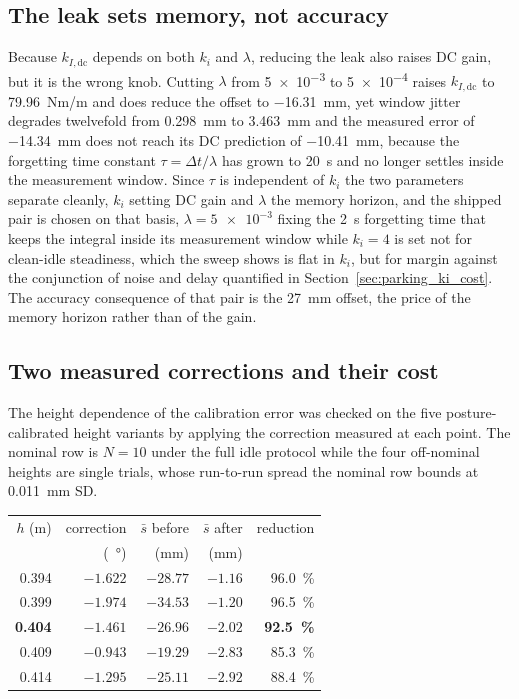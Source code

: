 \documentclass[a4paper,fleqn]{cas-dc}
\begin{document}
\subsection{The leak sets memory, not accuracy}

Because $k_{I,\text{dc}}$ depends on both $k_i$ and $\lambda$, reducing the leak
also raises DC gain, but it is the wrong knob. Cutting $\lambda$ from \num{5e-3}
to \num{5e-4} raises $k_{I,\text{dc}}$ to \SI{79.96}{Nm/m} and does reduce the
offset to \SI{-16.31}{mm}, yet window jitter degrades twelvefold from
\SI{0.298}{mm} to \SI{3.463}{mm} and the measured error of \SI{-14.34}{mm} does
not reach its DC prediction of \SI{-10.41}{mm}, because the forgetting time
constant $\tau{=}\Delta t/\lambda$ has grown to \SI{20}{s} and no longer settles
inside the measurement window. Since $\tau$ is independent of $k_i$ the two
parameters separate cleanly, $k_i$ setting DC gain and $\lambda$ the memory
horizon, and the shipped pair is chosen on that basis, $\lambda{=}\num{5e-3}$
fixing the \SI{2}{s} forgetting time that keeps the integral inside its
measurement window while $k_i{=}\num{4}$ is set not for clean-idle steadiness,
which the sweep shows is flat in $k_i$, but for margin against the conjunction of
noise and delay quantified in Section~\ref{sec:parking_ki_cost}. The accuracy
consequence of that pair is the \SI{27}{mm} offset, the price of the memory
horizon rather than of the gain.

\subsection{Two measured corrections and their cost}

The height dependence of the calibration error was checked on the five
posture-calibrated height variants by applying the correction measured at each
point. The nominal row is $N{=}10$ under the full idle protocol while the four
off-nominal heights are single trials, whose run-to-run spread the nominal row
bounds at \SI{0.011}{mm} SD.

\begin{center}\footnotesize
\begin{tabular}{rrrrr}
\hline
$h$ (m) & correction & $\bar{s}$ before & $\bar{s}$ after & reduction \\
 & (\SI{}{\degree}) & (mm) & (mm) & \\
\hline
0.394 & $-1.622$ & $-28.77$ & $-1.16$ & \SI{96.0}{\percent} \\
0.399 & $-1.974$ & $-34.53$ & $-1.20$ & \SI{96.5}{\percent} \\
\textbf{0.404} & $\mathbf{-1.461}$ & $\mathbf{-26.96}$ & $\mathbf{-2.02}$ & \textbf{\SI{92.5}{\percent}} \\
0.409 & $-0.943$ & $-19.29$ & $-2.83$ & \SI{85.3}{\percent} \\
0.414 & $-1.295$ & $-25.11$ & $-2.92$ & \SI{88.4}{\percent} \\
\hline
\end{tabular}
\end{center}
\end{document}
